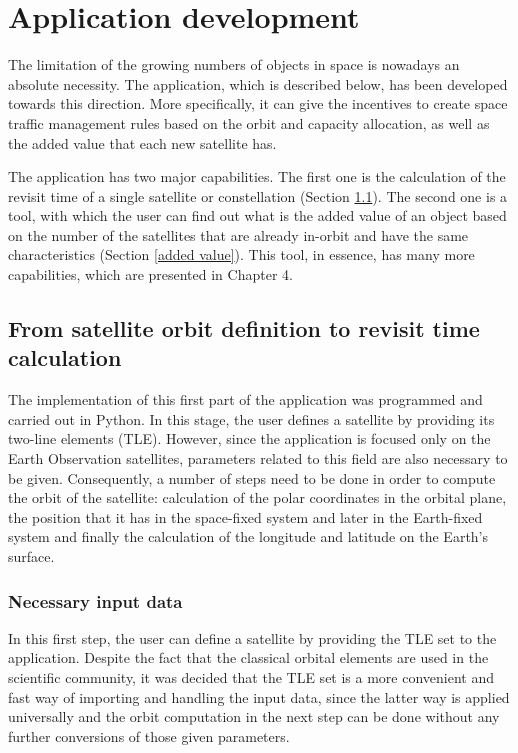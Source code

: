 \chapter{Application development}
\label{chap:3}
\bigskip

The limitation of the growing numbers of objects in space is nowadays an absolute necessity. The application, which is described below, has been developed towards this direction. More specifically, it can give the incentives to create space traffic management rules based on the orbit and capacity allocation, as well as the added value that each new satellite has.

The application has two major capabilities. The first one is the calculation of the revisit time of a single satellite or constellation (Section \ref{revisit time}). The second one is a tool, with which the user can find out what is the added value of an object based on the number of the satellites that are already in-orbit and have the same characteristics (Section \ref{added value}). This tool, in essence, has many more capabilities, which are presented in Chapter 4.%

\bigskip
\section{From satellite orbit definition to revisit time calculation}
\label{revisit time}
\bigskip

The implementation of this first part of the application was programmed and carried out in Python. In this stage, the user defines a satellite by providing its two-line elements (TLE). However, since the application is focused only on the Earth Observation satellites, parameters related to this field are also necessary to be given. Consequently, a number of steps need to be done in order to compute the orbit of the satellite: calculation of the polar coordinates in the orbital plane, the position that it has in the space-fixed system and later in the Earth-fixed system and finally the calculation of the longitude and latitude on the Earth's surface.

\bigskip
\subsection{Necessary input data}
\label{input_data}
\bigskip

In this first step, the user can define a satellite by providing the TLE set to the application. Despite the fact that the classical orbital elements are used in the scientific community, it was decided that the TLE set is a more convenient and fast way of importing and handling the input data, since the latter way is applied universally and the orbit computation in the next step can be done without any further conversions of those given parameters.


